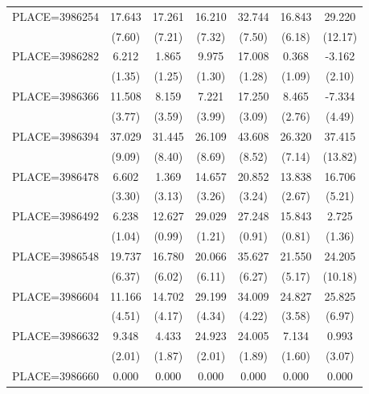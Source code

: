 {\begin{tabular}{l*{6}{c}}
PLACE=3986254       &      17.643&      17.261&      16.210&      32.744&      16.843&      29.220\\
                    &      (7.60)&      (7.21)&      (7.32)&      (7.50)&      (6.18)&     (12.17)\\
PLACE=3986282       &       6.212&       1.865&       9.975&      17.008&       0.368&      -3.162\\
                    &      (1.35)&      (1.25)&      (1.30)&      (1.28)&      (1.09)&      (2.10)\\
PLACE=3986366       &      11.508&       8.159&       7.221&      17.250&       8.465&      -7.334\\
                    &      (3.77)&      (3.59)&      (3.99)&      (3.09)&      (2.76)&      (4.49)\\
PLACE=3986394       &      37.029&      31.445&      26.109&      43.608&      26.320&      37.415\\
                    &      (9.09)&      (8.40)&      (8.69)&      (8.52)&      (7.14)&     (13.82)\\
PLACE=3986478       &       6.602&       1.369&      14.657&      20.852&      13.838&      16.706\\
                    &      (3.30)&      (3.13)&      (3.26)&      (3.24)&      (2.67)&      (5.21)\\
PLACE=3986492       &       6.238&      12.627&      29.029&      27.248&      15.843&       2.725\\
                    &      (1.04)&      (0.99)&      (1.21)&      (0.91)&      (0.81)&      (1.36)\\
PLACE=3986548       &      19.737&      16.780&      20.066&      35.627&      21.550&      24.205\\
                    &      (6.37)&      (6.02)&      (6.11)&      (6.27)&      (5.17)&     (10.18)\\
PLACE=3986604       &      11.166&      14.702&      29.199&      34.009&      24.827&      25.825\\
                    &      (4.51)&      (4.17)&      (4.34)&      (4.22)&      (3.58)&      (6.97)\\
PLACE=3986632       &       9.348&       4.433&      24.923&      24.005&       7.134&       0.993\\
                    &      (2.01)&      (1.87)&      (2.01)&      (1.89)&      (1.60)&      (3.07)\\
PLACE=3986660       &       0.000&       0.000&       0.000&       0.000&       0.000&       0.000\\

\end{tabular}}
